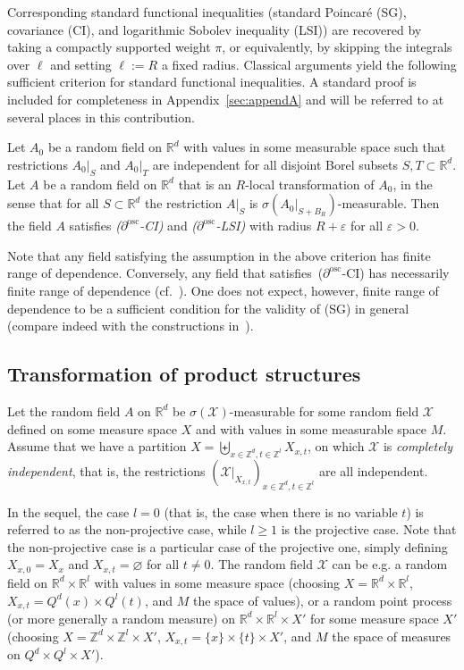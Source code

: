 \documentclass[AHL,Unicode,longabstracts]{cedram}
\newcommand{\R}{\mathbb R}
\newcommand{\Z}{\mathbb Z}
\newcommand{\X}{\mathcal X}
\newcommand{\e}{\varepsilon}
\newcommand{\osc}{\partial^{\mathrm{osc}}}
\newcommand*{\MK}{\mkern 2mu}
\begin{document}
Corresponding standard functional inequalities (standard Poincaré (SG), covariance (CI), and logarith\-mic Sobo\-lev inequality (LSI)) are recovered by taking a compactly supported weight $\pi$, or equivalently, by skipping the integrals over $\ell$ and setting $\ell:=R$ a fixed radius. Classical arguments yield the following sufficient criterion for standard functional inequalities. A standard proof is included for completeness in Appendix~\ref{sec:appendA} and will be referred to at several places in this contribution.

\begin{prop}\label{prop:criMSG}
Let $A_0$ be a random field on $\R^d$ with values in some measurable space such that restrictions $A_0|_{S}$ and $A_0|_T$ are independent for all disjoint Borel subsets $S,T\subset\R^d$. Let $A$ be a random field on $\R^d$ that is an $R$-local transformation of $A_0$, in the sense that for all $S\subset\R^d$ the restriction $A|_{S}$ is $\sigma(A_0|_{S+B_{R}})$-measurable. Then the field $A$ satisfies \emph{($\osc$-CI)} and \emph{($\osc$-LSI)} with radius $R+\e$ for all $\e>0$.
\end{prop}

Note that any field satisfying the assumption in the above criterion has finite range of dependence. Conversely, any field that satisfies~($\osc$-CI) has necessarily finite range of dependence (cf.~\cite[Proposition~1.4$\MK$(iv)]{DG1}). One does not expect, however, finite range of dependence to be a sufficient condition for the validity of (SG) in general (compare indeed with the constructions in~\cite{Burton-Goulet-Meester-93,Bradley-94}).


\subsection{Transformation of product structures}\label{eq:transfiid}

Let the random field $A$ on $\R^d$ be $\sigma(\X)$-measurable for some random field $\X$ defined on some measure space $X$ and with values in some measurable space $M$. Assume that we have a partition $X=\biguplus_{x\in\Z^d,t\in\Z^l}X_{x,t}$, on which $\X$ is \emph{completely independent}, that is, the restrictions $(\X|_{X_{x,t}})_{x\in\Z^d,t\in\Z^l}$ are all independent.


In the sequel, the case $l=0$ (that is, the case when there is no variable $t$) is referred to as the non-projective case, while $l\ge1$ is the projective case. Note that the non-projective case is a particular case of the projective one, simply defining $X_{x,0}=X_x$ and $X_{x,t}=\varnothing$ for all $t\ne0$. The random field $\X$ can be e.g. a random field on $\R^d\times\R^l$ with values in some measure space (choosing $X=\R^d\times\R^l$, $X_{x,t}=Q^d(x)\times Q^l(t)$, and $M$ the space of values), or a random point process (or more generally a random measure) on $\R^d\times\R^l\times X'$ for some measure space $X'$ (choosing $X=\Z^d\times\Z^l\times X'$, $X_{x,t}=\{x\}\times\{t\}\times X'$, and $M$ the space of measures on $Q^d\times Q^l\times X'$).
\end{document}
